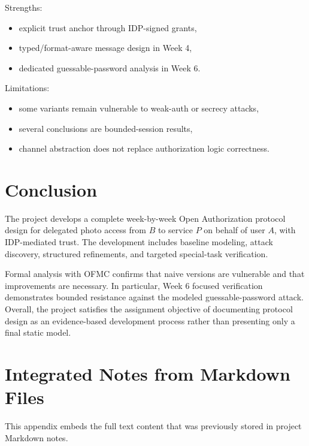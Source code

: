 \documentclass[11pt,a4paper]{article}
\begin{document}
Strengths:
\begin{itemize}
  \item explicit trust anchor through IDP-signed grants,
  \item typed/format-aware message design in Week 4,
  \item dedicated guessable-password analysis in Week 6.
\end{itemize}

Limitations:
\begin{itemize}
  \item some variants remain vulnerable to weak-auth or secrecy attacks,
  \item several conclusions are bounded-session results,
  \item channel abstraction does not replace authorization logic correctness.
\end{itemize}

\section{Conclusion}

The project develops a complete week-by-week Open Authorization protocol design for delegated photo access from $B$ to service $P$ on behalf of user $A$, with IDP-mediated trust.
The development includes baseline modeling, attack discovery, structured refinements, and targeted special-task verification.

Formal analysis with OFMC confirms that naive versions are vulnerable and that improvements are necessary.
In particular, Week 6 focused verification demonstrates bounded resistance against the modeled guessable-password attack.
Overall, the project satisfies the assignment objective of documenting protocol design as an evidence-based development process rather than presenting only a final static model.

\appendix
\section{Integrated Notes from Markdown Files}
This appendix embeds the full text content that was previously stored in project Markdown notes.
\end{document}
